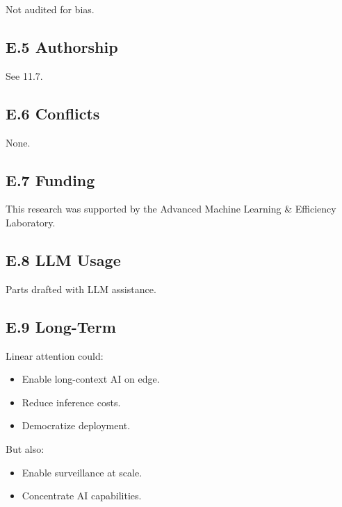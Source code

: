 Not audited for bias.

\subsection{E.5 Authorship}

See  11.7.

\subsection{E.6 Conflicts}

None.

\subsection{E.7 Funding}

This research was supported by the Advanced Machine Learning & Efficiency Laboratory.

\subsection{E.8 LLM Usage}

Parts drafted with LLM assistance.

\subsection{E.9 Long-Term}

Linear attention could:
\begin{itemize}
\item Enable long-context AI on edge.
\item Reduce inference costs.
\item Democratize deployment.

\end{itemize}
But also:
\begin{itemize}
\item Enable surveillance at scale.
\item Concentrate AI capabilities.

\end{itemize}
